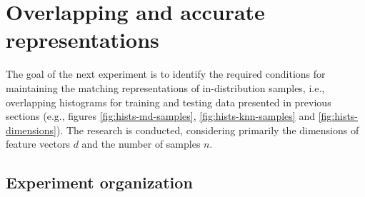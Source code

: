 \section{Overlapping and accurate representations}
\label{section:overlapping-experiment}

The goal of the next experiment is to identify the required conditions for maintaining the matching representations of in-distribution samples, i.e., overlapping histograms for training and testing data presented in previous sections (e.g., figures \ref{fig:hists-md-samples}, \ref{fig:hists-knn-samples} and \ref{fig:hists-dimensions}). The research is conducted, considering primarily the dimensions of feature vectors $d$ and the number of samples $n$.

\vspace{2.0em}  %


\subsection{Experiment organization}
\label{section:overlapping-organization}

